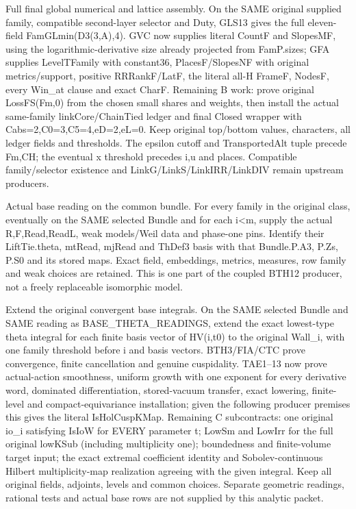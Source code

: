 \begin{description}[style=nextline]
\item[31. TASK\_GL\_FINAL\_ASSEMBLY --- B] Full final global numerical and lattice assembly. On the SAME original supplied family, compatible second-layer selector and Duty, GLS13 gives the full eleven-field FamGLmin(D3(3,A),4). GVC now supplies literal CountF and SlopesMF, using the logarithmic-derivative size already projected from FamP.sizes; GFA supplies LevelTFamily with constant36, PlacesF/SlopesNF with original metrics/support, positive RRRankF/LatF, the literal all-H FrameF, NodesF, every Win\_at clause and exact CharF. Remaining B work: prove original LossFS(Fm,0) from the chosen small shares and weights, then install the actual same-family linkCore/ChainTied ledger and final Closed wrapper with Cabs=2,C0=3,C5=4,eD=2,eL=0. Keep original top/bottom values, characters, all ledger fields and thresholds. The epsilon cutoff and TransportedAlt tuple precede Fm,CH; the eventual x threshold precedes i,u and places. Compatible family/selector existence and LinkG/LinkS/LinkIRR/LinkDIV remain upstream producers.

\item[32. BASE\_THETA\_READINGS --- C] Actual base reading on the common bundle. For every family in the original class, eventually on the SAME selected Bundle and for each i<m, supply the actual R,F,Read,ReadL, weak models/Weil data and phase-one pins. Identify their LiftTie.theta, mtRead, mjRead and ThDef3 basis with that Bundle.P.A3, P.Zs, P.S0 and its stored maps. Exact field, embeddings, metrics, measures, row family and weak choices are retained. This is one part of the coupled BTH12 producer, not a freely replaceable isomorphic model.

\item[33. BASE\_THETA\_CUSPIDAL\_EXTENSION --- C] Extend the original convergent base integrals. On the SAME selected Bundle and SAME reading as BASE\_THETA\_READINGS, extend the exact lowest-type theta integral for each finite basis vector of HV(i,t0) to the original Wall\_i, with one family threshold before i and basis vectors. BTH3/FIA/CTC prove convergence, finite cancellation and genuine cuspidality. TAE1–13 now prove actual-action smoothness, uniform growth with one exponent for every derivative word, dominated differentiation, stored-vacuum transfer, exact lowering, finite-level and compact-equivariance installation; given the following producer premises this gives the literal IsHolCuspKMap. Remaining C subcontracts: one original io\_i satisfying IsIoW for EVERY parameter t; LowSm and LowIrr for the full original lowKSub (including multiplicity one); boundedness and finite-volume target input; the exact extremal coefficient identity and Sobolev-continuous Hilbert multiplicity-map realization agreeing with the given integral. Keep all original fields, adjoints, levels and common choices. Separate geometric readings, rational tests and actual base rows are not supplied by this analytic packet.


\end{description}
